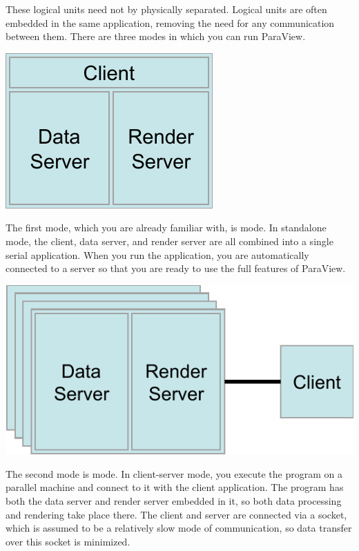 These logical units need not by physically separated.  Logical units are
often embedded in the same application, removing the need for any
communication between them.  There are three modes in which you can run
ParaView.

\begin{inlinefig}
  \includegraphics{images/RunModeStandalone}
\end{inlinefig}

The first mode, which you are already familiar with, is
 mode.  In standalone mode, the client, data server,
and render server are all combined into a single serial application.  When
you run the  application, you are automatically connected
to a  server so that you are ready to use the full
features of ParaView.

\begin{inlinefig}
  \includegraphics{images/RunModeClientServer}
\end{inlinefig}

The second mode is  mode.  In client-server mode,
you execute the  program on a parallel machine and
connect to it with the  client application.  The
 program has both the data server and render server
embedded in it, so both data processing and rendering take place there.
The client and server are connected via a socket, which is assumed to be a
relatively slow mode of communication, so data transfer over this socket is
minimized.

